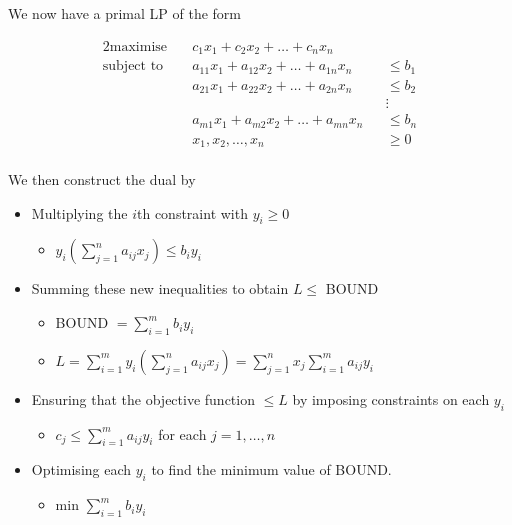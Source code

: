 \documentclass{article}
\theoremstyle{plain}
\theoremstyle{definition}
\begin{document}
        We now have a primal LP of the form

        \begin{alignat*}{2}
        \text{maximise} &\quad c_1 x_1 + c_2 x_2 + \ldots + c_n x_n  && \\
        \text{subject to} &\quad a_{11}x_1 + a_{12}x_2 + \ldots + a_{1n}x_n &&\leq b_1 \\
        &\quad a_{21}x_1 + a_{22}x_2 + \ldots + a_{2n}x_n &&\leq b_2 \\
        &    &&  \vdots \\ 
        &\quad a_{m1}x_1 + a_{m2}x_2 + \ldots + a_{mn}x_n &&\leq b_n \\
        &\quad x_1,x_2,\ldots,x_n &&\geq 0 \\
        \end{alignat*}

        We then construct the dual by 
        \begin{itemize}
            \item Multiplying the $i$th constraint with $y_i \geq 0$
            \begin{itemize}
                \item $y_i( \sum^n_{j=1} a_{ij}x_j ) \leq b_i y_i$
            \end{itemize}
            \item Summing these new inequalities to obtain $L \leq $ BOUND
            \begin{itemize}
                \item BOUND $= \sum^m_{i=1} b_i y_i $
                \item $L = \sum^m_{i=1} y_i(\sum^n_{j=1} a_{ij}x_j) = \sum^n_{j=1} x_j \sum^m_{i=1} a_{ij} y_i$
            \end{itemize}
            \item Ensuring that the objective function $\leq L$ by imposing constraints on each $y_i$
            \begin{itemize}
                \item $c_j \leq \sum^m_{i=1} a_{ij}y_i$ for each $j = 1, \ldots, n$
            \end{itemize}
            \item Optimising each $y_i$ to find the minimum value of BOUND. 
            \begin{itemize}
                \item min $ \sum^m_{i=1} b_i y_i $
            \end{itemize}
        \end{itemize}
\end{document}
